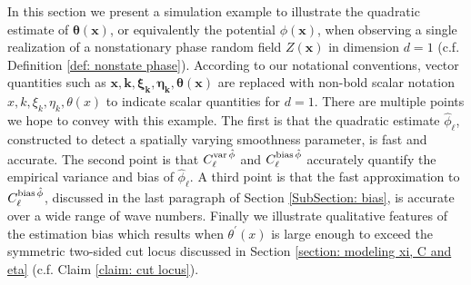 \documentclass[10pt,noinfoline]{imsart}
\newcommand{\bs}{\boldsymbol}
\begin{document}
\label{section: nonstat example d=1}


In this section we present a simulation example to illustrate the quadratic estimate of $\bs \theta(\bs x)$, or equivalently the potential $\phi(\bs x)$, when observing a single realization of a nonstationary phase random field $Z(\bs x)$ in dimension $d=1$ (c.f. Definition \ref{def: nonstate phase}).  According to our notational conventions, vector quantities such as  $\bs x, \bs k, \bs \xi_{\bs k},  \bs\eta_{\bs k}, \bs \theta(\bs x)$ are replaced with non-bold scalar notation $x, k, \xi_{k},  \eta_{k}, \theta(x)$ to indicate scalar quantities for $d=1$. There are multiple points we hope to convey with this example. The first is that the quadratic estimate $\hat\phi_\ell$, constructed to detect a spatially varying smoothness parameter, is fast and accurate. The second point is that $C^{\text{var\,}\hat\phi}_{\ell}$ and $C^{\text{bias\,}\hat\phi}_{\ell}$  accurately quantify the empirical variance and bias of $\hat\phi_\ell$. A third point is that the fast approximation to $C^{\text{bias\,}\hat\phi}_{\ell}$, discussed in the last paragraph of Section \ref{SubSection: bias}, is accurate over a wide range of wave numbers. Finally we illustrate qualitative features of the estimation bias which results when $\theta^\prime(x)$ is large enough to exceed the symmetric two-sided cut locus discussed in Section \ref{section: modeling xi, C and eta} (c.f. Claim \ref{claim: cut locus}).
\end{document}
